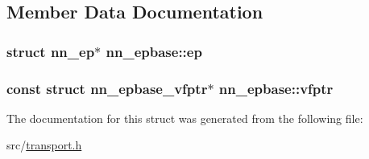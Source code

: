 \subsection{Member Data Documentation}
\subsubsection[{ep}]{\setlength{\rightskip}{0pt plus 5cm}struct {\bf nn\+\_\+ep}$\ast$ nn\+\_\+epbase\+::ep}\hypertarget{structnn__epbase_a9256f20b0f06b8eab213745afe91fced}{}\label{structnn__epbase_a9256f20b0f06b8eab213745afe91fced}
\subsubsection[{vfptr}]{\setlength{\rightskip}{0pt plus 5cm}const struct {\bf nn\+\_\+epbase\+\_\+vfptr}$\ast$ nn\+\_\+epbase\+::vfptr}\hypertarget{structnn__epbase_a7aeef264c3ec9adab7f7225e84689e41}{}\label{structnn__epbase_a7aeef264c3ec9adab7f7225e84689e41}


The documentation for this struct was generated from the following file\+:\begin{DoxyCompactItemize}
\item 
src/\hyperlink{transport_8h}{transport.\+h}\end{DoxyCompactItemize}
